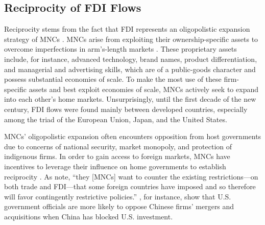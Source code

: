 \documentclass{article}
\begin{document}
\subsection{Reciprocity of FDI Flows}
Reciprocity stems from the fact that FDI represents an oligopolistic expansion strategy of MNCs \citep{Hymer:1976,Kindleberger:1969}. MNCs arise from exploiting their ownership-specific assets to overcome imperfections in arm's-length markets \citep{Caves:1996,Dunning:1992}. These proprietary assets include, for instance, advanced technology, brand names, product differentiation, and managerial and advertising skills, which are of a public-goods character and possess substantial economies of scale. To make the most use of these firm-specific assets and best exploit economies of scale, MNCs actively seek to expand into each other's home markets. Unsurprisingly, until the first decade of the new century, FDI flows were found mainly between developed countries, especially among the triad of the European Union, Japan, and the United States.

MNCs' oligopolistic expansion often encounters opposition from host governments due to concerns of national security, market monopoly, and protection of indigenous firms. In order to gain access to foreign markets, MNCs have incentives to leverage their influence on home governments to establish reciprocity \citep{Milner:1988,Crystal:2003}. As \citet[6]{Crystal:2003} note, ``they [MNCs] want to counter the existing restrictions---on both trade and FDI---that some foreign countries have imposed and so therefore will favor contingently restrictive policies.'' \citet{Tingley:2015}, for instance, show that U.S. government officials are more likely to oppose Chinese firms' mergers and acquisitions when China has blocked U.S. investment.

\end{document}
